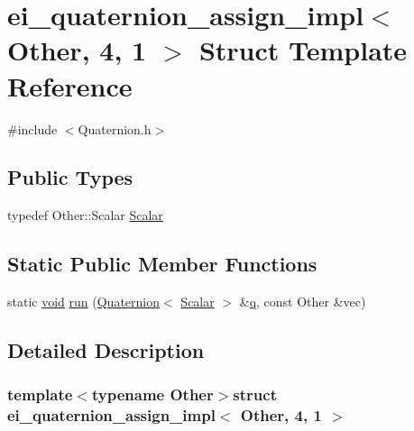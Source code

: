 \hypertarget{structei__quaternion__assign__impl_3_01_other_00_014_00_011_01_4}{\section{ei\-\_\-quaternion\-\_\-assign\-\_\-impl$<$ Other, 4, 1 $>$ Struct Template Reference}
\label{structei__quaternion__assign__impl_3_01_other_00_014_00_011_01_4}
}


{\ttfamily \#include $<$Quaternion.\-h$>$}

\subsection*{Public Types}
\begin{DoxyCompactItemize}
\item 
typedef Other\-::\-Scalar \hyperlink{structei__quaternion__assign__impl_3_01_other_00_014_00_011_01_4_ad63c15483065a693ff609addc1202f36}{Scalar}
\end{DoxyCompactItemize}
\subsection*{Static Public Member Functions}
\begin{DoxyCompactItemize}
\item 
static \hyperlink{group___u_a_v_objects_plugin_ga444cf2ff3f0ecbe028adce838d373f5c}{void} \hyperlink{structei__quaternion__assign__impl_3_01_other_00_014_00_011_01_4_a4d51254f8477378de5884d3ff04ad02a}{run} (\hyperlink{class_quaternion}{Quaternion}$<$ \hyperlink{structei__quaternion__assign__impl_3_01_other_00_014_00_011_01_4_ad63c15483065a693ff609addc1202f36}{Scalar} $>$ \&\hyperlink{glext_8h_afb30bc844faa48275d1c84294956a44b}{q}, const Other \&vec)
\end{DoxyCompactItemize}


\subsection{Detailed Description}
\subsubsection*{template$<$typename Other$>$struct ei\-\_\-quaternion\-\_\-assign\-\_\-impl$<$ Other, 4, 1 $>$}




